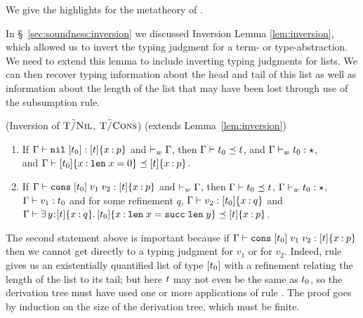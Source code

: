 We give the highlights for the metatheory of \sysrfd.


\label{sec:soundnessD:inversion}
%
In \S~\ref{sec:soundness:inversion} we discussed Inversion Lemma
\ref{lem:inversion}, which allowed us to invert the typing judgment
for a term- or type-abstraction. We need to extend this 
lemma to include inverting typing judgments for lists.
%
We can then recover typing information about the head and tail 
of this list as well as information about the length of the list that
may have been lost through use of the subsumption \tSub rule.

\begin{lemma} (Inversion of $\textsc{T\=/Nil}$, $\textsc{T\=/Cons}$) \label{lem:inversionD} 
    (extends Lemma~\ref{lem:inversion})
    \begin{enumerate}
    \item If ${\mathrm{\Gamma}} \vdash {\ensuremath{\texttt{nil}\;[{t_0}]}} : {{{[t]}\{x \mathbin{:} p\}}}$
    and $\vdash_w {\mathrm{\Gamma}}$,
    then ${\mathrm{\Gamma}} \vdash t_0 \preceq t$, and
    ${\mathrm{\Gamma}} \vdash_w {t_0} : {\star}$,\\
    and ${\mathrm{\Gamma}} \vdash {\ensuremath{{[t_0]}\{x \mathbin{:} \mathtt{len}\; x = 0\}}} \preceq {\ensuremath{{[t]}\{x \mathbin{:} p\}}}$.

    \item If ${\mathrm{\Gamma}} \vdash {\ensuremath{\texttt{cons}\;[{t_0}]\;{v_1}\;{v_2}}} : {{{[t]}\{x \mathbin{:} p\}}}$
    and $\vdash_w {\mathrm{\Gamma}}$,
    then 
    ${\mathrm{\Gamma}} \vdash t_0 \preceq t$,
    ${\mathrm{\Gamma}} \vdash_w {t_0} : {\star}$,
    ${\mathrm{\Gamma}} \vdash {v_1} : {t_0}$
    and for some refinement $q$,
    ${\mathrm{\Gamma}} \vdash {v_2} : {{{[t_0]}\{x \mathbin{:} q\}}}$
    and ${\mathrm{\Gamma}} \vdash \exists\, y\hspace{0.05em}{:}\hspace{0.05em} {\ensuremath{{[t]}\{x \mathbin{:} q\}}}.\, {{[t_0]}\{x \mathbin{:} \mathtt{len}\; x = \mathtt{succ}\; \mathtt{len}\; y\}}  \preceq {\ensuremath{{[t]}\{x \mathbin{:} p\}}}$.

  \end{enumerate}                    

\end{lemma}
%
The second statement above is important because if
${\mathrm{\Gamma}} \vdash {\ensuremath{\texttt{cons}\;[{t_0}]\;{v_1}\;{v_2}}} : {{{[t]}\{x \mathbin{:} p\}}}$
then we cannot get directly to a typing judgment for $v_1$
or for $v_2$. Indeed, rule \tCons gives us an existentially
quantified list of type $[t_0]$ with a refinement
relating the length of the list to its tail; but here $t$
may not even be the same as $t_0$, so the derivation tree
must have used one or more applications of rule \tSub.
%
The proof goes by induction on the size of the derivation tree,
 which must be finite.   

